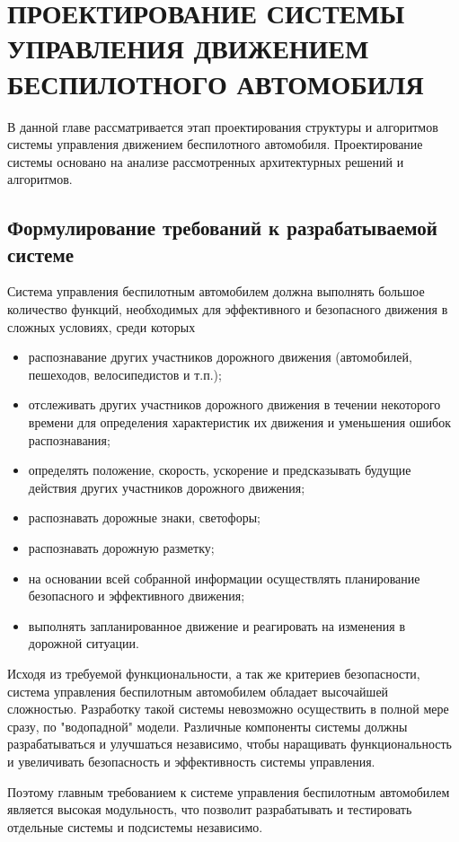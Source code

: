 \chapter{ПРОЕКТИРОВАНИЕ СИСТЕМЫ УПРАВЛЕНИЯ ДВИЖЕНИЕМ БЕСПИЛОТНОГО АВТОМОБИЛЯ}
В данной главе рассматривается этап проектирования структуры и алгоритмов системы управления движением беспилотного
автомобиля. Проектирование системы основано на анализе рассмотренных архитектурных решений и алгоритмов.

\section{Формулирование требований к разрабатываемой системе}


Система управления беспилотным автомобилем должна выполнять большое количество функций, необходимых для эффективного
и безопасного движения в сложных условиях, среди которых
\begin{itemize}
    \item распознавание других участников дорожного движения (автомобилей, пешеходов,
          велосипедистов и т.п.);
    \item отслеживать других участников дорожного движения в течении некоторого времени для определения характеристик
          их движения и уменьшения ошибок распознавания;
    \item определять положение, скорость, ускорение и предсказывать будущие действия других участников дорожного
          движения;
    \item распознавать дорожные знаки, светофоры;
    \item распознавать дорожную разметку;
    \item на основании всей собранной информации осуществлять планирование безопасного и эффективного движения;
    \item выполнять запланированное движение и реагировать на изменения в дорожной ситуации.
\end{itemize}

Исходя из требуемой функциональности, а так же критериев безопасности, система управления беспилотным автомобилем
обладает высочайшей сложностью. Разработку такой системы невозможно осуществить в полной мере сразу, по "водопадной"
модели. Различные компоненты системы должны разрабатываться и улучшаться независимо, чтобы наращивать функциональность
и увеличивать безопасность и эффективность системы управления.

Поэтому главным требованием к системе управления беспилотным автомобилем является высокая модульность, что позволит
разрабатывать и тестировать отдельные системы и подсистемы независимо.

